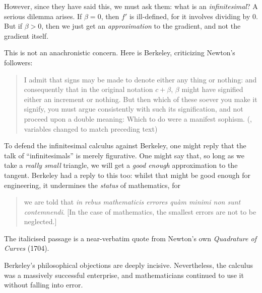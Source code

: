 \documentclass[../../../include/open-logic-section]{subfiles}
\begin{document}
However, since they have said this, we must ask them: what is an
\emph{infinitesimal}? A serious dilemma arises. If $\beta = 0$, then
$f'$ is ill-defined, for it involves dividing by $0$. But if $\beta >
0$, then we just get an \emph{approximation} to the gradient, and not
the gradient itself. 

This is not an anachronistic concern. Here is Berkeley, criticizing
Newton's followers:
\begin{quote}
I admit that signs may be made to denote either any thing or nothing:
and consequently that in the original notation $c + \beta$, $\beta$
might have signified either an increment or nothing. But then which of
these soever you make it signify, you must argue consistently with
such its signification, and not proceed upon a double meaning: Which
to do were a manifest sophism. (\citealt[\S{}XIII]{Berkeley1734},
variables changed to match preceding text)
\end{quote}
To defend the infinitesimal calculus against Berkeley, one might reply
that the talk of ``infinitesimals'' is merely figurative. One might
say that, so long as we take a \emph{really small} triangle, we will
get a \emph{good enough} approximation to the tangent. Berkeley had a
reply to this too: whilst that might be good enough for engineering,
it undermines the \emph{status} of mathematics,  for
\begin{quote}
we are told that \emph{in rebus mathematicis errores qu\`{a}m minimi
non sunt contemnendi}. [In the case of mathematics, the smallest
errors are not to be neglected.] \citep[\S{}IX]{Berkeley1734}
\end{quote}
The italicised passage is a near-verbatim quote from Newton's own
\emph{Quadrature of Curves} (1704). 

Berkeley's philosophical objections are deeply incisive. Nevertheless,
the calculus was a massively successful enterprise, and mathematicians
continued to use it without falling into error.
\end{document}
